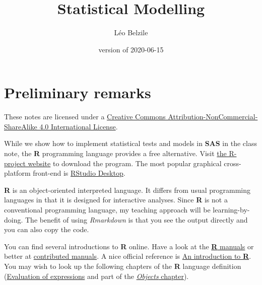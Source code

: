 \documentclass[
]{book}
\title{Statistical Modelling}
\author{Léo Belzile}
\date{version of 2020-06-15}
\let\oldhref\href
\renewcommand{\href}[2]{#2\footnote{\url{#1}}}
\begin{document}
\maketitle

\let\href\oldhref

{
\setcounter{tocdepth}{1}
\tableofcontents
}
\hypertarget{preliminary-remarks}{%
\chapter*{Preliminary remarks}\label{preliminary-remarks}}

These notes are licensed under a \href{http://creativecommons.org/licenses/by-nc-sa/4.0/}{Creative Commons Attribution-NonCommercial-ShareAlike 4.0 International License}.

While we show how to implement statistical tests and models in \textbf{SAS} in the class note, the \textbf{R} programming language provides a free alternative. Visit \href{https://cran.r-project.org/}{the R-project website} to download the program. The most popular graphical cross-platform front-end is \href{https://www.rstudio.com/products/rstudio/download/}{RStudio Desktop}.

\textbf{R} is an object-oriented interpreted language. It differs from usual programming languages in that it is designed for interactive analyses. Since \textbf{R} is not a conventional programming language, my teaching approach will be learning-by-doing. The benefit of using \emph{Rmarkdown} is that you see the output directly and you can also copy the code.

\newcommand{\bs}[1]{\boldsymbol{#1}}
\newcommand{\Hmat}{\mathbf{H}}
\newcommand{\Mmat}{\mathbf{M}}
\newcommand{\mX}{\mathbf{X}}
\newcommand{\bX}{{\mathbf{X}}}
\newcommand{\bx}{{\mathbf{x}}}
\newcommand{\by}{{\boldsymbol{y}}}
\newcommand{\bY}{{\boldsymbol{Y}}}
\newcommand{\eps}{\varepsilon}
\newcommand{\beps}{\boldsymbol{\varepsilon}}
\newcommand{\bbeta}{\boldsymbol{\beta}}
\newcommand{\hbb}{\hat{\boldsymbol{\beta}}}
\newcommand{\limni}{\lim_{n \ra \infty}}
\newcommand{\Sp}{\mathscr{S}}
\newcommand{\Hy}{\mathscr{H}}
\newcommand{\E}[2][]{{\mathsf E}_{#1}\left(#2\right)}
\newcommand{\Va}[2][]{{\mathsf{Var}_{#1}}\left(#2\right)}
\newcommand{\I}[1]{{\mathbf 1}_{#1}}

You can find several introductions to \textbf{R} online. Have a look at the \href{https://cran.r-project.org/manuals.html}{\textbf{R} manuals} or better at \href{https://cran.r-project.org/other-docs.html}{contributed manuals}. A nice official reference is \href{http://colinfay.me/intro-to-r/index.html}{An introduction to \textbf{R}}.
You may wish to look up the following chapters of the \textbf{R} language definition (\href{http://colinfay.me/r-language-definition/evaluation-of-expressions.html}{Evaluation of expressions} and part of the \href{http://colinfay.me/r-language-definition/objects.html}{\emph{Objects} chapter}).
\end{document}

